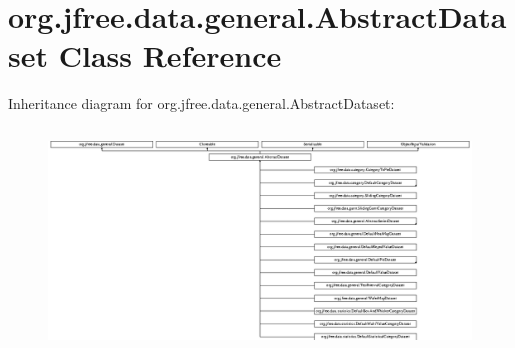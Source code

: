 \hypertarget{classorg_1_1jfree_1_1data_1_1general_1_1_abstract_dataset}{}\section{org.\+jfree.\+data.\+general.\+Abstract\+Dataset Class Reference}
\label{classorg_1_1jfree_1_1data_1_1general_1_1_abstract_dataset}
Inheritance diagram for org.\+jfree.\+data.\+general.\+Abstract\+Dataset\+:\begin{figure}[H]
\begin{center}
\leavevmode
\includegraphics[height=5.973333cm]{classorg_1_1jfree_1_1data_1_1general_1_1_abstract_dataset}
\end{center}
\end{figure}
